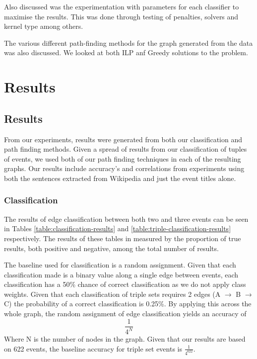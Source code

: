 \documentclass[bsc,frontabs,twoside,singlespacing,parskip,deptreport]{infthesis}     %
\begin{document}
Also discussed was the experimentation with parameters for each classifier to maximise the results. This was done through
testing of penalties, solvers and kernel type among others.

The various different path-finding methods for the graph generated from the data was also discussed.
We looked at both ILP anf Greedy solutions to the problem.

\chapter{Results}
\section{Results}
From our experiments, results were generated from both our classification and path finding methods.
Given a spread of results from our classification of tuples of events, we used both of our path finding
techniques in each of the resulting graphs. Our results include accuracy's and correlations from
experiments using both the sentences extracted from Wikipedia and just the event titles alone.   

\subsection{Classification}
The results of edge classification between both two and three events can be seen in Tables \ref{table:classification-results}
and \ref{table:triple-classification-results} respectively. The results of these tables in measured by the
proportion of true results, both positive and negative, among the total number of results.

The baseline used for classification is a random assignment.
Given that each classification made is a binary value along a single edge between events, each classification has a
50\% chance of correct classification as we do not apply class weights.
Given that each classification of triple sets requires 2 edges (A $\rightarrow$ B $\rightarrow$ C) the probability of a correct
classification is 0.25\%. By applying this across the whole graph, the random assignment of edge classification yields an
accuracy of
\begin{equation}
\frac{1}{4^N} \nonumber
\end{equation}
Where N is the number of nodes in the graph.
Given that our results are based on 622 events, the baseline accuracy for triple set events is $\frac{1}{4^{622}}$.
\end{document}
